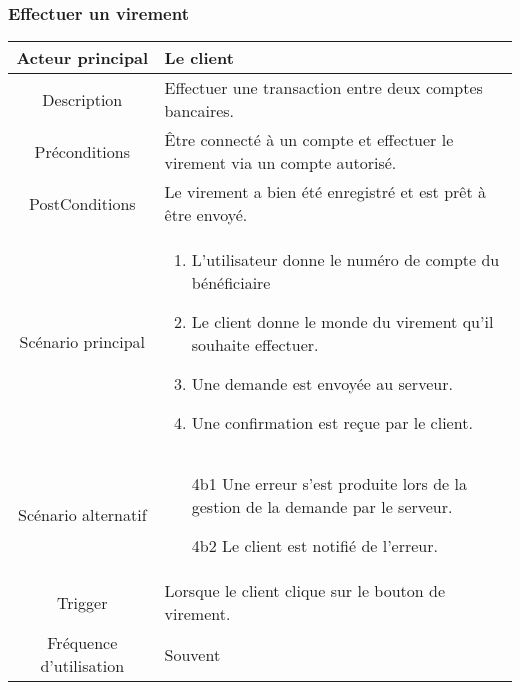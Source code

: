 \documentclass{article}
\begin{document}
\subsubsection{Effectuer un virement}
\begin{table}[h]
      \begin{tabular}{|c|p{10cm}|}
         \hline
         Acteur principal&Le client\\
         \hline
         Description&Effectuer une transaction entre deux comptes bancaires.\\
         \hline
         Préconditions&Être connecté à un compte et effectuer le virement via un compte autorisé.\\
         \hline
         PostConditions&Le virement a bien été enregistré et est prêt à être envoyé.\\
         \hline
         Scénario principal& 
               \begin{enumerate}
                  \item L'utilisateur donne le numéro de compte du bénéficiaire
                  \item Le client donne le monde du virement qu'il souhaite effectuer.
                  \item Une demande est envoyée au serveur.
                  \item Une confirmation est reçue par le client.
               \end{enumerate}     \\
         \hline
         Scénario alternatif&
               \begin{itemize}
                  \item[4b1] Une erreur s'est produite lors de la gestion de la demande par le serveur.
                  \item[4b2] Le client est notifié de l'erreur.  
               \end{itemize}\\
         \hline
         Trigger&Lorsque le client clique sur le bouton de virement.\\
         \hline
         Fréquence d'utilisation&Souvent\\
         \hline
      \end{tabular}
\end{table}

\newpage
\end{document}
